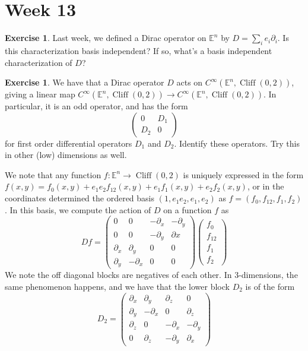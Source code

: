 \documentclass[psamsfonts]{amsart}
\theoremstyle{definition}
\newtheorem{exer}[thm]{Exercise}
\theoremstyle{remark}
\newcommand{\E}{\mathbb{E}}
\DeclareMathOperator{\Cliff}{Cliff}
\begin{document}
\section*{Week 13}
%
\setcounter{thm}{0}
%
\setcounter{section}{13}
%
\begin{exer}
Last week, we defined a Dirac operator on $\E^n$ by $D = \sum_i e_i\partial_i$. Is this characterization basis independent? If so, what's a basis independent characterization of $D$?
\end{exer}
%
\begin{exer}
We have that a Dirac operator $D$ acts on $C^\infty(\E^n, \Cliff(0,2))$, giving a linear map $C^\infty(\E^n, \Cliff(0,2)) \to C^\infty(\E^n, \Cliff(0,2))$. In particular, it is an odd operator, and has the form 
$$\begin{pmatrix}
0 & D_1 \\
D_2 & 0
\end{pmatrix}$$
for first order differential operators $D_1$ and $D_2$. Identify these operators. Try this in other (low) dimensions as well.
\end{exer}
We note that any function $f : \E^n \to \Cliff(0,2)$ is uniquely expressed in the form $f(x,y) = f_0(x,y) + e_1e_2f_{12}(x,y) + e_1f_1(x,y) + e_2f_2(x,y)$, or in the coordinates determined the ordered basis $(1, e_1e_2, e_1, e_2)$ as $f = (f_0,f_{12},f_1,f_2)$. In this basis, we compute the action of $D$ on a function $f$ as 
$$ Df = \begin{pmatrix}
0 & 0 & -\partial_x & -\partial_y \\
0 & 0 & -\partial_y & \partial x \\
\partial_x & \partial_y & 0 & 0 \\
\partial_y & -\partial_x & 0 & 0
\end{pmatrix}\begin{pmatrix}
f_0 \\
f_{12} \\
f_1 \\
f_2
\end{pmatrix}$$
We note the off diagonal blocks are negatives of each other. In $3$-dimensions, the same phenomenon happens, and we have that the lower block $D_2$ is of the form
$$ D_2 = \begin{pmatrix}
\partial_x & \partial_y & \partial_z & 0 \\
\partial_y & -\partial_x & 0 & \partial_z \\
\partial_z & 0 & -\partial_x & -\partial_y \\
0 & \partial_z & -\partial_y & \partial_x
\end{pmatrix}$$
\end{document}
